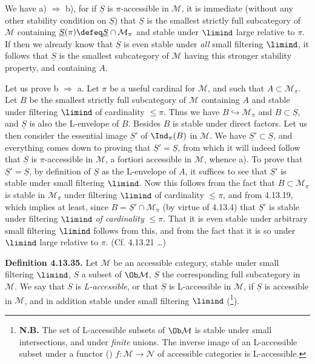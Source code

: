 
We have a) $\Longrightarrow$ b), for if $\underline{S}$ is $\pi$-accessible in $\mathcal{M}$, it is immediate (without any other stability condition on $\underline{S}$) that $\underline{S}$ is the smallest strictly full subcategory of $\mathcal{M}$ containing $\underline{S}(\pi) \defeq \underline{S}\cap\mathcal{M}_\pi$ and stable under $\limind$ large relative to $\pi$. If then we already know that $\underline{S}$ is even stable under \textit{all} small filtering $\limind$, it follows that $\underline{S}$ is the smallest subcategory of $\mathcal{M}$ having this stronger stability property, and containing $A$.

Let us prove b $\Longrightarrow$ a. Let $\pi$ be a useful cardinal for $\mathcal{M}$, and such that $A \subset \mathcal{M}_\pi$. Let $B$ be the smallest strictly full subcategory of $\mathcal{M}$ containing $A$ and stable under filtering $\limind$ of cardinality $\leqslant \pi$. Thus we have $B \hookrightarrow \mathcal{M}_\pi$ and $B \subset \underline{S}$, and $\underline{S}$ is also the L-envelope of $B$. Besides $B$ is stable under
direct factors. Let us then consider the essential image $\underline{S}'$ of $\Ind_\pi(B)$ in $\mathcal{M}$. We have $\underline{S}' \subset \underline{S}$, and everything comes down to proving that $\underline{S}' = \underline{S}$, from which it will indeed follow that $\underline{S}$ is $\pi$-accessible in $\mathcal{M}$, a fortiori accessible in $\mathcal{M}$, whence a). To prove that $\underline{S}' = \underline{S}$, by definition of $\underline{S}$ as the L-envelope of $A$, it suffices to see that $\underline{S}'$ is stable under small filtering $\limind$. Now this follows from the fact that $B \subset \mathcal{M}_\pi$ is stable in $\mathcal{M}_\pi$ under filtering $\limind$ of cardinality $\leqslant \pi$, and from 4.13.19, which implies at least, since $B = \underline{S}' \cap \mathcal{M}_\pi$ (by virtue of 4.13.4) that $\underline{S}'$ is stable under filtering $\limind$ \textit{of cardinality} $\leqslant \pi$. That it is even stable under arbitrary small filtering $\limind$ follows from this, and from the fact that it is so under $\limind$ large relative to $\pi$. (Cf. 4.13.21 \dots) %


\textbf{Definition 4.13.35.} Let $\mathcal{M}$ be an accessible category, stable under small filtering $\limind$, $S$ a subset of $\Ob \mathcal{M}$, $\underline{S}$ the corresponding full subcategory in $\mathcal{M}$. We say that $S$ is \textit{L-accessible}, or that $\underline{S}$ is L-accessible in $\mathcal{M}$, if $\underline{S}$ is accessible in $\mathcal{M}$, and in addition stable under small filtering $\limind$ (\footnote[158]{\textbf{N.B.} The set of L-accessible subsets of $\Ob \mathcal{M}$ is stable under small intersections, and under \textit{finite} unions. The inverse image of an L-accessible subset under a functor (\footnotemark[159]) $f : \mathcal{M} \longrightarrow \mathcal{N}$ of accessible categories is L-accessible.}).

